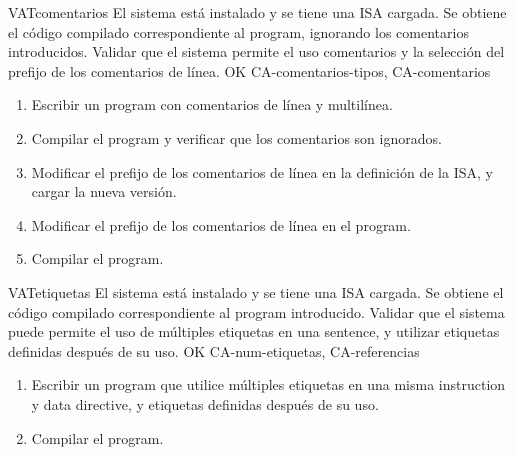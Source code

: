 \begin{testCase}{VAT}{comentarios}
    {El sistema está instalado y se tiene una \gls{ISA} cargada.} %
    {Se obtiene el código compilado correspondiente al \gls{program}, ignorando los
    comentarios introducidos.} %
    {Validar que el sistema permite el uso comentarios y la selección del
    prefijo de los comentarios de línea.} %
    {OK} %
    {CA-comentarios-tipos, CA-comentarios} %
    \begin{enumerate}[leftmargin=*, topsep=0pt, noitemsep] %
        \item Escribir un \gls{program} con comentarios de línea y multilínea.
        \item Compilar el \gls{program} y verificar que los comentarios son
        ignorados.
        \item Modificar el prefijo de los comentarios de línea en la definición
        de la \gls{ISA}, y cargar la nueva versión.
        \item Modificar el prefijo de los comentarios de línea en el
        \gls{program}.
        \item Compilar el \gls{program}.
    \end{enumerate}
\end{testCase}

\begin{testCase}{VAT}{etiquetas}
    {El sistema está instalado y se tiene una \gls{ISA} cargada.} %
    {Se obtiene el código compilado correspondiente al \gls{program} introducido.} %
    {Validar que el sistema puede permite el uso de múltiples etiquetas en una
    \gls{sentence}, y utilizar etiquetas definidas después de su uso.} %
    {OK} %
    {CA-num-etiquetas, CA-referencias} %
    \begin{enumerate}[leftmargin=*, topsep=0pt, noitemsep] %
        \item Escribir un \gls{program} que utilice múltiples etiquetas en una
        misma \gls{instruction} y \gls{data directive}, y etiquetas definidas
        después de su uso.
        \item Compilar el \gls{program}.
    \end{enumerate}
\end{testCase}

